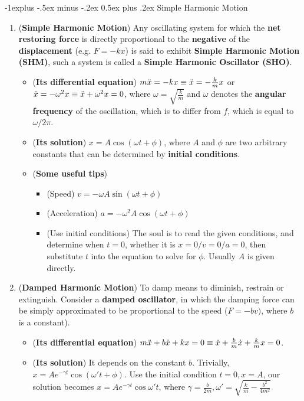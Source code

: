 \documentclass[10pt, landscape]{article}
\makeatletter
\renewcommand{\subsection}{\@startsection{subsection}{2}{0mm}%
                                {-1explus -.5ex minus -.2ex}%
                                {0.5ex plus .2ex}%
                                {\normalfont\normalsize\bfseries}}
\makeatother
\begin{document}
\begin{multicols}{4}
\subsection{Simple Harmonic Motion}
\begin{enumerate}
    \item (\textbf{Simple Harmonic Motion}) Any oscillating system for which the \textbf{net restoring force} is directly proportional to the \textbf{negative} of the \textbf{displacement} (e.g. $F=-kx$) is said to exhibit \textbf{Simple Harmonic Motion (SHM)}, such a system is called a \textbf{Simple Harmonic Oscillator (SHO)}.
    \begin{itemize}
        \item (\textbf{Its differential equation}) $m\Ddot{x}=-kx \equiv \Ddot{x}=-\frac{k}{m}x$ or $\Ddot{x}=-\omega^2x \equiv \Ddot{x}+\omega^2x=0$, where $\omega=\sqrt{\frac{k}{m}}$ and $\omega$ denotes the \textbf{angular frequency} of the oscillation, which is to differ from $f$, which is equal to $\omega / 2\pi$.
        \item (\textbf{Its solution}) $x=A\cos(\omega t+\phi)$, where $A$ and $\phi$ are two arbitrary constants that can be determined by \textbf{initial conditions}.
        \item (\textbf{Some useful tips}) 
        \begin{itemize}
            \item (Speed) $v=-\omega A\sin(\omega t+\phi)$
            \item (Acceleration) $a=-\omega^2A\cos(\omega t+\phi)$
            \item (Use initial conditions) The soul is to read the given conditions, and determine when $t=0$, whether it is $x=0/v=0/a=0$, then substitute $t$ into the equation to solve for $\phi$. Usually $A$ is given directly.
        \end{itemize}
    \end{itemize}
    \item (\textbf{Damped Harmonic Motion}) To damp means to diminish, restrain or extinguish. Consider a \textbf{damped oscillator}, in which the damping force can be simply approximated to be proportional to the speed ($F=-bv)$, where $b$ is a constant).
    \begin{itemize}
        \item (\textbf{Its differential equation}) $m\Ddot{x}+b\Dot{x}+kx=0 \equiv \Ddot{x}+\frac{b}{m}\Dot{x}+\frac{k}{m}x=0$.
        \item (\textbf{Its solution}) It depends on the constant $b$. Trivially, $x=Ae^{-\gamma t}\cos(\omega't+\phi)$. Use the initial condition $t=0, x=A$, our solution becomes $x=Ae^{-\gamma t}\cos\omega't$, where $\gamma=\frac{b}{2m}, \omega'=\sqrt{\frac{k}{m}-\frac{b^2}{4m^2}}$

\end{itemize}
\end{enumerate}
\end{multicols}
\end{document}
